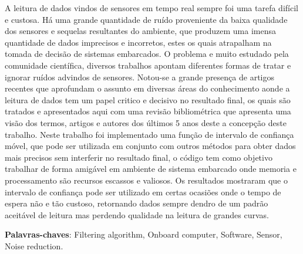 \setlength{\absparsep}{18pt} %
\begin{resumo}
	A leitura de dados vindos de sensores em tempo real sempre foi uma tarefa difícil e custosa. Há uma grande quantidade de ruído proveniente da baixa qualidade dos sensores e sequelas resultantes do ambiente, que produzem uma imensa quantidade de dados imprecisos e incorretos, estes os quais atrapalham na tomada de decisão de sistemas embarcados. O problema e muito estudado pela comunidade científica, diversos trabalhos apontam diferentes formas de tratar e ignorar ruídos advindos de sensores. Notou-se a grande presença de artigos recentes que aprofundam o assunto em diversas áreas do conhecimento aonde a leitura de dados tem um papel critico e decisivo no resultado final, os quais são tratados e apresentados aqui com uma revisão bibliométrica que apresenta uma visão dos termos, artigos e autores dos últimos 5 anos deste a concepção deste trabalho. Neste trabalho foi implementado uma função de intervalo de confiança móvel, que pode ser utilizada em conjunto com outros métodos para obter dados mais precisos sem interferir no resultado final, o código tem como objetivo trabalhar de forma amigável em ambiente de sistema embarcado onde memoria e processamento são recursos escassos e valiosos. Os resultados mostraram que o intervalo de confiança pode ser utilizado em certas ocasiões onde o tempo de espera não e tão custoso, retornando dados sempre dendro de um padrão aceitável de leitura mas perdendo qualidade na leitura de grandes curvas.
	



	\textbf{Palavras-chaves}: Filtering algorithm, Onboard computer, Software, Sensor, Noise reduction.
\end{resumo}


